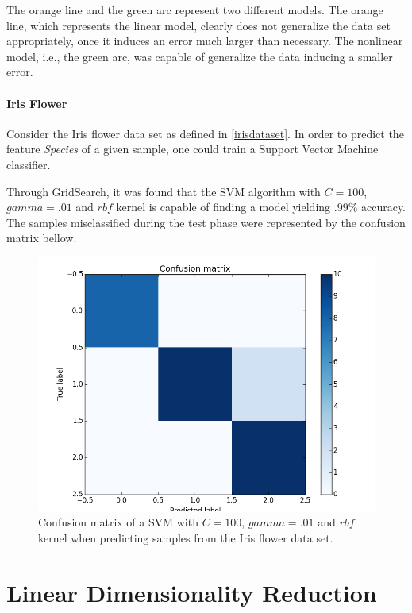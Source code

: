 \documentclass[12pt]{article}
\begin{document}
The orange line and the green arc represent two different models. The orange line, which represents the linear model, clearly does not generalize the data set appropriately, once it induces an error much larger than necessary. \cite{roh2015} The nonlinear model, i.e., the green arc, was capable of generalize the data inducing a smaller error.

\paragraph{Iris Flower}

Consider the Iris flower data set as defined in \ref{irisdataset}. In order to predict the feature {\em Species} of a given sample, one could train a Support Vector Machine classifier.

Through GridSearch, it was found that the SVM algorithm with $C=100$, $gamma=.01$ and $rbf$ kernel is capable of finding a model yielding .99\% accuracy. The samples misclassified during the test phase were represented by the confusion matrix bellow.

\begin{figure}[H]
	\centering
	\captionsetup{justification=centering}

	\includegraphics[scale=.5]{svm_cm_iris}
	\caption{Confusion matrix of a SVM with $C=100$, $gamma=.01$ and $rbf$ kernel when predicting samples from the Iris flower data set.}
	\label{fig:cmsvmiris}
\end{figure}

\section{Linear Dimensionality Reduction}
\end{document}

